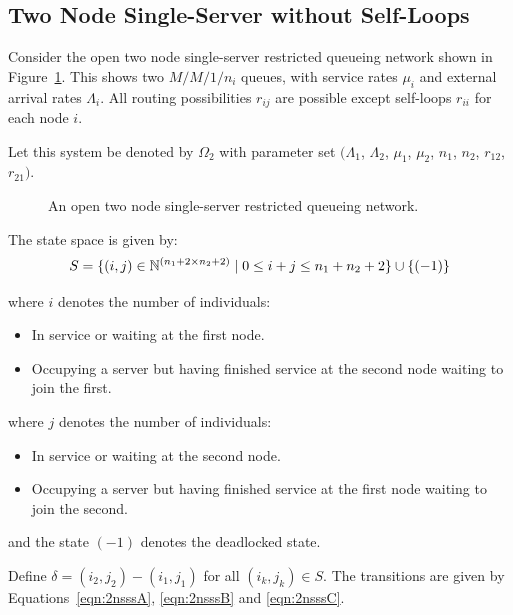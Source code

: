 \documentclass{article}
\numberwithin{equation}{section}
\begin{document}
\subsection{Two Node Single-Server without Self-Loops}\label{sec:2nodewithoutselfloops}

Consider the open two node single-server restricted queueing network shown in Figure~\ref{fig:queueingnetwork_2nodes}.
This shows two \(M/M/1/n_i\) queues, with service rates $\mu_i$ and external arrival rates $\Lambda_i$.
All routing possibilities $r_{ij}$ are possible except self-loops $r_{ii}$ for each node $i$.

Let this system be denoted by $\Omega_2$ with parameter set $(\Lambda_1$, $\Lambda_2$, $\mu_1$, $\mu_2$, $n_1$, $n_2$, $r_{12}$, $r_{21})$.

\begin{figure}[!htbp]
  \begin{center}
  
  \end{center}
  \caption{An open two node single-server restricted queueing network.}
  \label{fig:queueingnetwork_2nodes}
\end{figure}

The state space is given by:
    \[S = \{(i,j)\in\mathbb{N}^{(n_1+2\times n_2+2)} \nonscript\; | \nonscript\; 0 \leq i + j \leq n_1 + n_2 + 2
    \}\cup\{(-1)\}\]

    where \(i\) denotes the number of individuals:
        \begin{itemize}
            \item In service or waiting at the first node.
            \item Occupying a server but having finished service at the
                second node waiting to join the first.
        \end{itemize}
    where \(j\) denotes the number of individuals:
        \begin{itemize}
            \item In service or waiting at the second node.
            \item Occupying a server but having finished service at the
                first node waiting to join the second.
        \end{itemize}
    and the state $(-1)$ denotes the deadlocked state.

Define $\delta = (i_2, j_2) - (i_1, j_1)$ for all $(i_k, j_k) \in S$. The transitions are given by Equations~\ref{eqn:2nsssA}, \ref{eqn:2nsssB} and \ref{eqn:2nsssC}.
\end{document}

